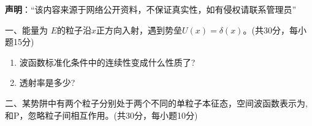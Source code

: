 
\textbf{声明}：“该内容来源于网络公开资料，不保证真实性，如有侵权请联系管理员”

一、能量为 $E$的粒子沿$x$正方向入射，遇到势垒$U(x)=\delta(x)$。(共30分，每小题15分)
\begin{enumerate}
\item 波函数标准化条件中的连续性变成什么性质了?
\item 透射率是多少?
\end{enumerate}

二、某势阱中有两个粒子分别处于两个不同的单粒子本征态，空间波函数表示为,和P，忽略粒子间相互作用。(共30分，每小题10分)